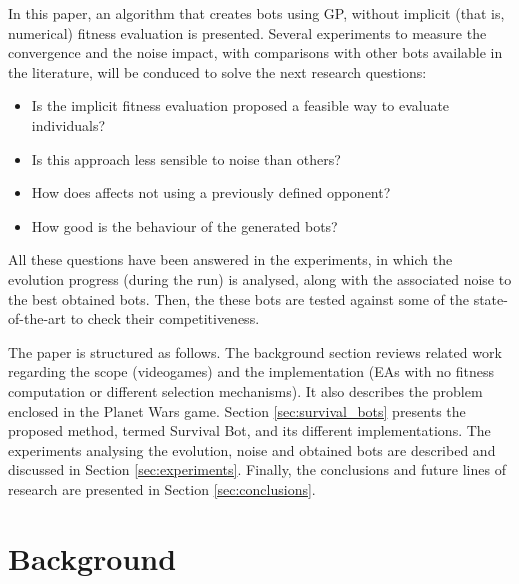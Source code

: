 \documentclass[conference]{IEEEtran}
\begin{document}
In this paper, an algorithm that creates bots using GP, without implicit (that is, numerical) fitness evaluation is presented. Several experiments to measure the convergence and the noise impact, with comparisons with other bots available in the literature, will be conduced to solve the next research questions:
\begin{itemize}
\item Is the implicit fitness evaluation proposed a feasible way to evaluate individuals?
\item Is this approach less sensible to noise than others?
\item How does affects not using a previously defined opponent?
\item How good is the behaviour of the generated bots?
\end{itemize}

All these questions have been answered in the experiments, in which the evolution progress (during the run) is analysed, along with the associated noise to the best obtained bots. Then, the these bots are tested against some of the state-of-the-art to check their competitiveness.

The paper is structured as follows. The background section reviews related work regarding the scope (videogames) and the implementation (EAs with no fitness computation or different selection mechanisms). It also describes the problem enclosed in the Planet Wars game.
Section \ref{sec:survival_bots} presents the proposed method, termed {Survival Bot}, and its different implementations.
The experiments analysing the evolution, noise and obtained bots are described and discussed in Section \ref{sec:experiments}. Finally, the conclusions and future lines of research are presented in Section \ref{sec:conclusions}.



%
\section{Background}

\end{document}
